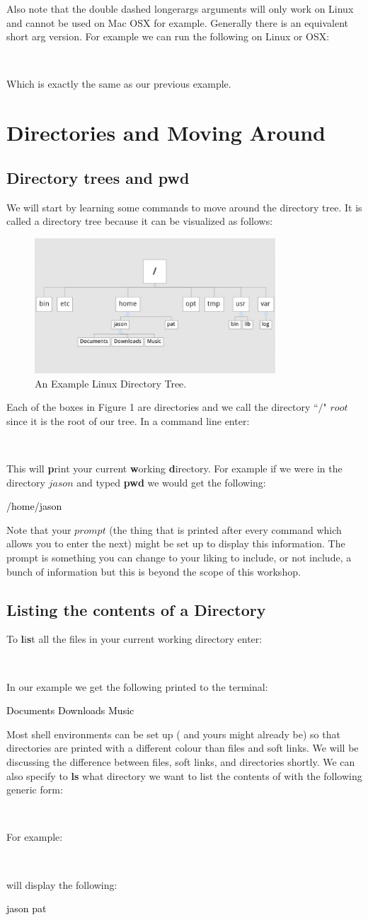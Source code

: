 \documentclass[oneside]{book}
\newcommand{\commandline}[1]{\begin{center} \colorbox{Dark}{\textcolor{white}{#1}} \end{center}}
\newcommand{\exampleout}[1]{\begin{center} \colorbox{Light}{\textcolor{black}{#1}} \end{center}}
\begin{document}
Also note that the double dashed longerargs arguments will only work on Linux and cannot be used on Mac OSX for example. Generally there is an equivalent short arg version. For example we can run the following on Linux or OSX:
\commandline{head -v -n 20 myfile}
Which is exactly the same as our previous example. 

\section{Directories and Moving Around}

\subsection{Directory trees and pwd}
We will start by learning some commands to move around the directory tree. It is called a directory tree because it can be visualized as follows:
\begin{figure}[ht!]
	\centering
	\includegraphics[width=90mm]{linux-directory-tree.jpg}
	\caption{An Example Linux Directory Tree.} 
\end{figure}

Each of the boxes in Figure 1 are directories and we call the directory ``$/$" $root$ since it is the root of our tree. In a command line enter:
	\commandline{pwd}
  This will \textbf{p}rint your current \textbf{w}orking \textbf{d}irectory. For example if we were in the directory $jason$ and typed \textbf{pwd} we would get the following:
	\exampleout {/home/jason}
  Note that your $prompt$ (the thing that is printed after every command which allows you to enter the next) might be set up to display this information. The prompt is something you can change to your liking to include, or not include, a bunch of information but this is beyond the scope of this workshop. \\

\subsection{Listing the contents of a Directory}
To \textbf{l}i\textbf{s}t all the files in your current working directory enter:
	\commandline{ls}
In our example we get the following printed to the terminal:
	\exampleout {Documents Downloads Music}
	Most shell environments can be set up ( and yours might already be) so that directories are printed with a different colour than files and soft links. We will be discussing the difference between files, soft links, and directories shortly. We can also specify to \textbf{ls} what directory we want to list the contents of with the following generic form:
  	\commandline{ls dirname}
For example:
	\commandline{ls /home}
will display the following:
	\exampleout{jason pat}
	
\end{document}
